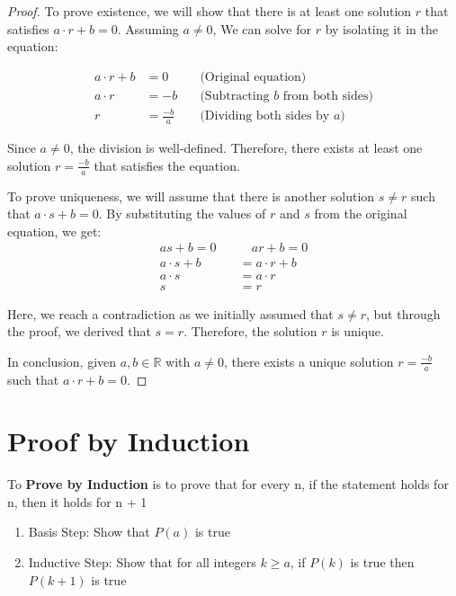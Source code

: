 \documentclass{report}
\begin{document}
    \begin{proof}
        To prove existence, we will show that there is at least one solution $r$ that satisfies $a \cdot r + b = 0$. Assuming $a\ne0$, We can solve for $r$ by isolating it in the equation:


    \begin{align*}
    a \cdot r + b &= 0 \quad &\text{(Original equation)} \\
    a \cdot r &= -b \quad &\text{(Subtracting $b$ from both sides)} \\
    r &= \frac{-b}{a} \quad &\text{(Dividing both sides by $a$)}
    \end{align*}
    \bigbreak \noindent 

    Since $a \ne 0$, the division is well-defined. Therefore, there exists at least one solution $r = \frac{-b}{a}$ that satisfies the equation.
    \bigbreak \noindent 

    To prove uniqueness, we will assume that there is another solution $s \ne r$ such that $a \cdot s + b = 0$. By substituting the values of $r$ and $s$ from the original equation, we get:
    \begin{align*}
        as + b = 0 \quad &\quad ar + b = 0\\
    a \cdot s + b &= a \cdot r + b \\
    a \cdot s &= a \cdot r \\
    s &= r
    \end{align*}
    \bigbreak \noindent 

    Here, we reach a contradiction as we initially assumed that $s \ne r$, but through the proof, we derived that $s = r$. Therefore, the solution $r$ is unique.
    \bigbreak \noindent 

    In conclusion, given $a, b \in \mathbb{R}$ with $a \ne 0$, there exists a unique solution $r = \frac{-b}{a}$ such that $a \cdot r + b = 0$.
    \end{proof}

    \pagebreak \bigbreak \noindent 
    \section{\LARGE Proof by Induction}
    \bigbreak \noindent 
    \smallbreak \noindent
    \begin{definition}
    To \textbf{Prove by Induction} is to prove that for every n, if the statement holds for n, then it holds for n + 1 
    \begin{enumerate}
        \item Basis Step: Show that $P(a)$ is true
        \item Inductive Step: Show that for all integers $k \geq a$, if $P(k)$ is true then $P(k+1)$ is true
    \end{enumerate}
    \end{definition}
\end{document}
